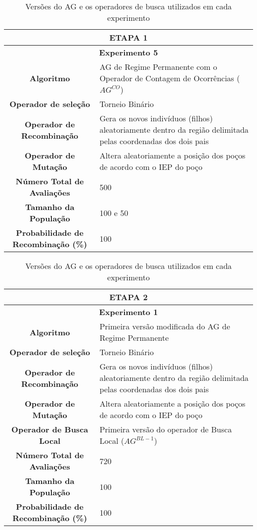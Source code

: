  \begin{table}[H]
\centering
\caption{Versões do AG e os operadores de busca utilizados em cada experimento}

\begin{tabular}{|c|p{9cm}|}
 \hline
  \multicolumn{2}{|c|}{ETAPA 1} \\ \hline
  \multicolumn{2}{|c|}{\textbf{Experimento 5}} \\ \hline
\textbf{Algoritmo} &AG de Regime Permanente com o Operador de Contagem de Ocorrências ($AG^{CO}$) \\ \hline
 \textbf{Operador de seleção} & Torneio Binário \\ \hline
 \textbf{Operador de Recombinação} & Gera os novos indivíduos (filhos) aleatoriamente dentro da região delimitada pelas coordenadas dos dois pais \\  \hline
 \textbf{Operador de Mutação} & Altera aleatoriamente a posição dos poços de acordo com o IEP do poço \\ \hline
 \textbf{Número Total de Avaliações} & 500 \\ \hline
 \textbf{Tamanho da População} & 100 e 50 \\ \hline
 \textbf{Probabilidade de Recombinação (\%)} & 100 \\ \hline
 
 
\end{tabular}
\end{table} 
 
 \begin{table}[H]
\centering
\caption{Versões do AG e os operadores de busca utilizados em cada experimento}

\begin{tabular}{|c|p{9cm}|}
 \hline
 \multicolumn{2}{|c|}{ETAPA 2} \\ \hline
 \multicolumn{2}{|c|}{\textbf{Experimento 1}} \\ \hline
 \textbf{Algoritmo} & Primeira versão modificada do AG de Regime Permanente  \\ \hline
 \textbf{Operador de seleção} & Torneio Binário \\ \hline
 \textbf{Operador de Recombinação} & Gera os novos indivíduos (filhos) aleatoriamente dentro da região delimitada pelas coordenadas dos dois pais \\  \hline
 \textbf{Operador de Mutação} & Altera aleatoriamente a posição dos poços de acordo com o IEP do poço \\ \hline
 \textbf{Operador de Busca Local} & Primeira versão do operador de Busca Local ($AG^{BL-1}$) \\ \hline
 \textbf{Número Total de Avaliações} & 720 \\ \hline
 \textbf{Tamanho da População} & 100 \\ \hline
 \textbf{Probabilidade de Recombinação (\%)} & 100 \\ \hline
\end{tabular}
\end{table} 
 
